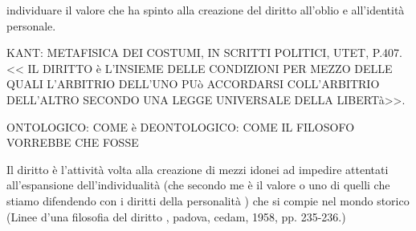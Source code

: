 individuare il valore che ha spinto alla creazione del diritto all'oblio e all'identità personale.


KANT: METAFISICA DEI COSTUMI, IN SCRITTI POLITICI, UTET, P.407.
<< IL DIRITTO è L'INSIEME DELLE CONDIZIONI PER MEZZO DELLE QUALI L'ARBITRIO DELL'UNO PUò ACCORDARSI COLL'ARBITRIO DELL'ALTRO SECONDO UNA LEGGE UNIVERSALE DELLA LIBERTà>>.

ONTOLOGICO: COME è 
DEONTOLOGICO: COME IL FILOSOFO VORREBBE CHE FOSSE

Il diritto è l'attività volta alla creazione di mezzi idonei ad impedire attentati all'espansione dell'individualità (che secondo me è il valore o uno di quelli che stiamo difendendo con i diritti della personalità ) che si compie nel mondo storico (Linee d'una filosofia del diritto , padova, cedam, 1958, pp. 235-236.)


